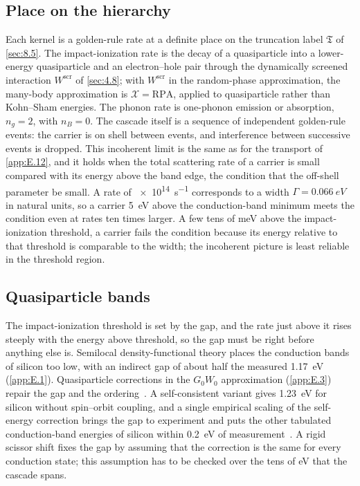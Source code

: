 \subsection{Place on the hierarchy}

Each kernel is a golden-rule rate at a definite place on the truncation label $\mathfrak{T}$ of \cref{sec:8.5}. The impact-ionization rate is the decay of a quasiparticle into a lower-energy quasiparticle and an electron--hole pair through the dynamically screened interaction $W^{\mathrm{scr}}$ of \cref{sec:4.8}; with $W^{\mathrm{scr}}$ in the random-phase approximation, the many-body approximation is $\mathcal{X} = \mathrm{RPA}$, applied to quasiparticle rather than Kohn--Sham energies. The phonon rate is one-phonon emission or absorption, $n_g = 2$, with $n_B = 0$. The cascade itself is a sequence of independent golden-rule events: the carrier is on shell between events, and interference between successive events is dropped. This incoherent limit is the same as for the transport of \cref{app:E.12}, and it holds when the total scattering rate of a carrier is small compared with its energy above the band edge, the condition that the off-shell parameter be small. A rate of \SI{e14}{s^{-1}} corresponds to a width $\varGamma = \SI{0.066}{eV}$ in natural units, so a carrier \SI{5}{eV} above the conduction-band minimum meets the condition even at rates ten times larger. A few tens of meV above the impact-ionization threshold, a carrier fails the condition because its energy relative to that threshold is comparable to the width; the incoherent picture is least reliable in the threshold region.

\subsection{Quasiparticle bands}

The impact-ionization threshold is set by the gap, and the rate just above it rises steeply with the energy above threshold, so the gap must be right before anything else is. Semilocal density-functional theory places the conduction bands of silicon too low, with an indirect gap of about half the measured \SI{1.17}{eV} (\cref{app:E.1}). Quasiparticle corrections in the $G_0W_0$ approximation (\cref{app:E.3}) repair the gap and the ordering~\cite{hybertsen1986electron}. A self-consistent variant gives \SI{1.23}{eV} for silicon without spin--orbit coupling, and a single empirical scaling of the self-energy correction brings the gap to experiment and puts the other tabulated conduction-band energies of silicon within \SI{0.2}{eV} of measurement~\cite[Table~I]{kotani2010impact}. A rigid scissor shift fixes the gap by assuming that the correction is the same for every conduction state; this assumption has to be checked over the tens of eV that the cascade spans.

